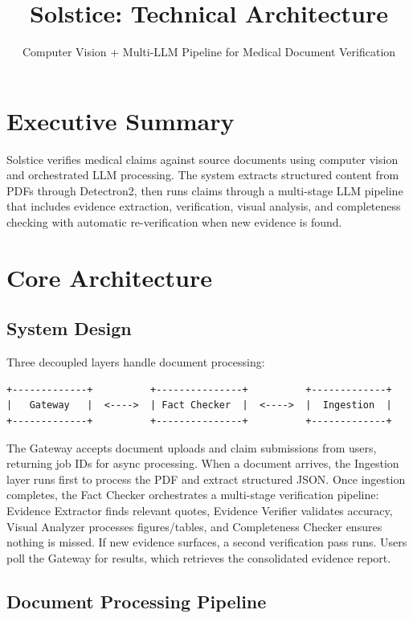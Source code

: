 \documentclass[11pt]{article}
\title{\textbf{Solstice: Technical Architecture}}
\author{Computer Vision + Multi-LLM Pipeline for Medical Document Verification}
\date{}
\begin{document}
\maketitle

\section{Executive Summary}

Solstice verifies medical claims against source documents using computer vision and orchestrated LLM processing. The system extracts structured content from PDFs through Detectron2, then runs claims through a multi-stage LLM pipeline that includes evidence extraction, verification, visual analysis, and completeness checking with automatic re-verification when new evidence is found.

\section{Core Architecture}

\subsection{System Design}

Three decoupled layers handle document processing:

\begin{verbatim}
+-------------+          +---------------+          +-------------+
|   Gateway   |  <---->  | Fact Checker  |  <---->  |  Ingestion  |
+-------------+          +---------------+          +-------------+
\end{verbatim}

The Gateway accepts document uploads and claim submissions from users, returning job IDs for async processing. When a document arrives, the Ingestion layer runs first to process the PDF and extract structured JSON. Once ingestion completes, the Fact Checker orchestrates a multi-stage verification pipeline: Evidence Extractor finds relevant quotes, Evidence Verifier validates accuracy, Visual Analyzer processes figures/tables, and Completeness Checker ensures nothing is missed. If new evidence surfaces, a second verification pass runs. Users poll the Gateway for results, which retrieves the consolidated evidence report.

\subsection{Document Processing Pipeline}
\end{document}
